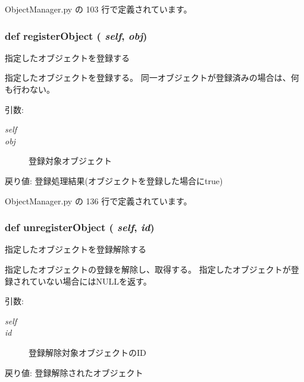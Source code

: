  ObjectManager.py の 103 行で定義されています。
\subsubsection{\setlength{\rightskip}{0pt plus 5cm}def registerObject ( {\em self},  {\em obj})}\label{classsource__py_1_1_object_manager_1_1_object_manager_fd3e6ba3f73a332eed353e5fa75ec71e}


指定したオブジェクトを登録する 

指定したオブジェクトを登録する。 同一オブジェクトが登録済みの場合は、何も行わない。

\begin{Desc}
\item[引数:]
\begin{description}
\item[{\em self}]\item[{\em obj}]登録対象オブジェクト\end{description}
\end{Desc}
\begin{Desc}
\item[戻り値:]登録処理結果(オブジェクトを登録した場合にtrue) \end{Desc}


 ObjectManager.py の 136 行で定義されています。
\subsubsection{\setlength{\rightskip}{0pt plus 5cm}def unregisterObject ( {\em self},  {\em id})}\label{classsource__py_1_1_object_manager_1_1_object_manager_f138d062f8f8aa74d8394b2b21b624d1}


指定したオブジェクトを登録解除する 

指定したオブジェクトの登録を解除し、取得する。 指定したオブジェクトが登録されていない場合にはNULLを返す。

\begin{Desc}
\item[引数:]
\begin{description}
\item[{\em self}]\item[{\em id}]登録解除対象オブジェクトのID\end{description}
\end{Desc}
\begin{Desc}
\item[戻り値:]登録解除されたオブジェクト \end{Desc}



